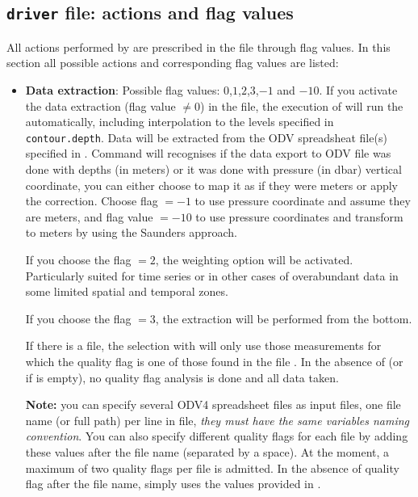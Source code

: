 \pagebreak 

\subsection{{\tt driver} file: actions and flag values\label{driverflags}}

All actions performed by  are prescribed in the file  through flag values. In this section all
possible actions and corresponding flag values are listed:

\begin{itemize}
\item {\bf Data extraction}: Possible flag values: $0$,$1$,$2$,$3$,$-1$ and $-10$. If you activate the data extraction (flag value $\neq 0$)
in the  file, the execution of  will run the  automatically, including
interpolation to the levels specified in {\tt contour.depth}. Data will be extracted from the ODV spreadsheat file(s) specified in
. Command  will recognises if the data export to ODV file was done with depths (in meters)
or it was done with pressure (in dbar) vertical coordinate, you can either choose to map it as if they were meters or apply 
the \citet{SAUNDERS81} correction. Choose flag $=-1$ to use pressure coordinate and assume they are meters, and flag value $=-10$ 
to use pressure coordinates and transform to meters by using the Saunders approach.

If you choose the flag $=2$, the weighting option will be activated. Particularly suited for time series or in other cases of overabundant 
data in some limited spatial and temporal zones.

If you choose the flag $=3$, the extraction will be performed from the bottom.

If there is a  file, the selection with  will only use those measurements for which the quality flag is one of those found in the file . In the absence of  (or if  is empty), no quality flag analysis is done and all data taken.

{\bf Note:} you can specify several ODV4 spreadsheet files as input files, one file name (or full path) per line in  file, {\it they must have the same variables naming convention}. You can also specify different quality flags for each file by adding these values after the file name (separated by a space). At the moment, a maximum of two quality flags per file is admitted. In the absence of quality flag after the file name,  simply uses the values provided in .


\end{itemize}
